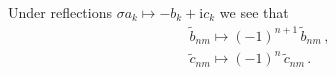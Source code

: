 \documentclass[aip,cha,showpacs,reprint]{revtex4-1} %
\newcommand{\bseq}{\begin{subequations}}
\newcommand{\eseq}{\end{subequations}}
\newcommand{\refeq}  [1] {Eq.~(\ref{#1})}                   %
\newcommand{\On}[1]{\ensuremath{\textrm{O}(#1)}}
\newcommand{\Refl}{\ensuremath{\sigma}}
\newcommand{\ii}{\ensuremath{\mathrm{i}}} %
\begin{document}




Under reflections $\Refl a_k \mapsto-b_k+\ii c_k$ we see that
\bseq\label{eq:SO2chebRefl}
 \begin{align}
  \tilde{b}_{nm} \mapsto (-1)^{n+1}\, \tilde{b}_{nm}\,,\\
  \tilde{c}_{nm} \mapsto (-1)^{n}\, \tilde{c}_{nm}\,.
 \end{align}
\eseq
%
\end{document}

